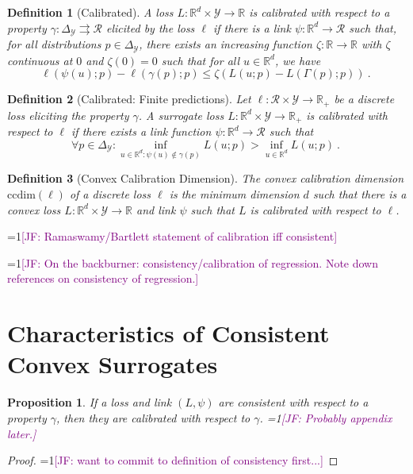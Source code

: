 \documentclass{article}
\newcommand{\Comments}{1}
\newcommand{\mynote}[2]{\ifnum\Comments=1\textcolor{#1}{#2}\fi}
\newcommand{\jessie}[1]{\mynote{purple}{[JF: #1]}}
\newcommand{\reals}{\mathbb{R}}
\newcommand{\simplex}{\Delta_\Y}
\newcommand{\ccdim}{\mathrm{ccdim}}
\newcommand{\R}{\mathcal{R}}
\newcommand{\Y}{\mathcal{Y}}
\newcommand{\toto}{\rightrightarrows}
\newtheorem{proposition}{Proposition}
\newtheorem{definition}{Definition}
\begin{document}
\begin{definition}[Calibrated]\label{def:calibrated-general}
	A loss $L:\reals^d \times \Y \to \reals$ is \emph{calibrated} with respect to a property $\gamma : \simplex \toto \R$ elicited by the loss $\ell$ if there is a link $\psi : \reals^d \to \R$ such that, for all distributions $p \in \simplex$, there exists an increasing function $\zeta : \reals \to \reals$ with $\zeta$ continuous at $0$ and $\zeta(0) = 0$ such that for all $u \in \reals^d$, we have
	\begin{equation}
	\ell( \psi(u); p) - \ell(\gamma(p); p)  \leq \zeta \left(  L(u;p) - L(\Gamma(p); p) \right)~.~
	\end{equation}
\end{definition}
\begin{definition}[Calibrated: Finite predictions]\label{def:calibrated-finite}
	Let $\ell : \R \times \Y \to \reals_+$ be a discrete loss eliciting the property $\gamma$.
	A surrogate loss $L : \reals^d \times \Y \to \reals_+$ is \emph{calibrated} with respect to $\ell$ if there exists a link function $\psi: \reals^d \to \R$ such that
	\begin{equation}\label{eq:calibration}
	\forall p \in \simplex: \inf_{u \in \reals^d : \psi(u) \not \in \gamma(p)} L(u;p) > \inf_{u \in \reals^d} L(u;p)~.~
	\end{equation}
\end{definition}

\begin{definition}[Convex Calibration Dimension]
The \emph{convex calibration dimension} $\ccdim(\ell)$ of a discrete loss $\ell$ is the minimum dimension $d$ such that there is a convex loss $L: \reals^d \times \Y \to \reals$ and link $\psi$ such that $L$ is calibrated with respect to $\ell$.
\end{definition}

\jessie{Ramaswamy/Bartlett statement of calibration iff consistent}


\jessie{On the backburner: consistency/calibration of regression.  Note down references on consistency of regression.}

\section{Characteristics of Consistent Convex Surrogates}\label{sec:char-convex}


\begin{proposition}\label{prop:consistent-implies-calibrated}
	If a loss and link $(L, \psi)$ are consistent with respect to a property $\gamma$, then they are calibrated with respect to $\gamma$.
	\jessie{Probably appendix later.}
\end{proposition}
\begin{proof}
	\jessie{ want to commit to definition of consistency first...}
\end{proof}
\end{document}
